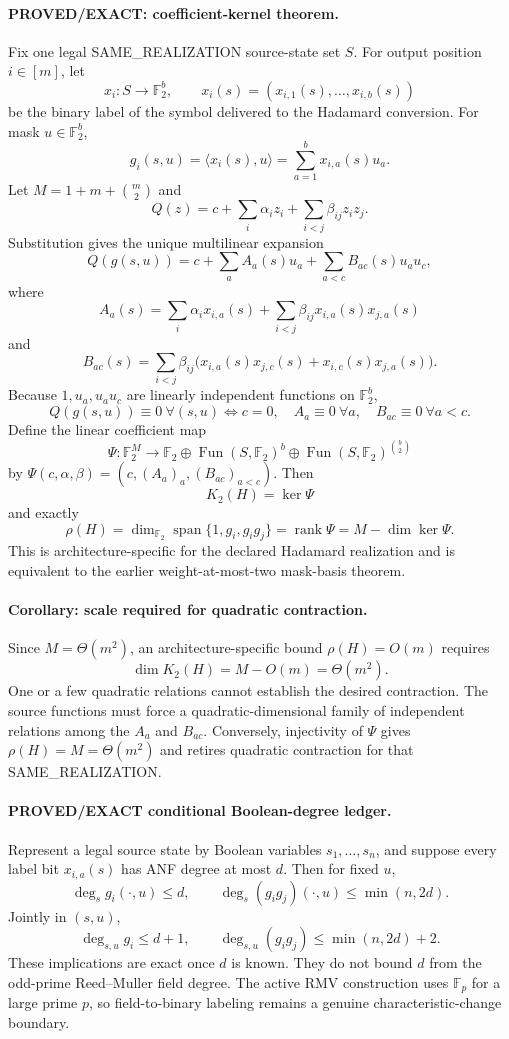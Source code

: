 \documentclass[11pt]{article}
\begin{document}
\paragraph{PROVED/EXACT: coefficient-kernel theorem.}
Fix one legal SAME\_REALIZATION source-state set $S$. For output position $i\in[m]$, let
\[
x_i:S\to\mathbb F_2^b,\qquad x_i(s)=(x_{i,1}(s),\ldots,x_{i,b}(s))
\]
be the binary label of the symbol delivered to the Hadamard conversion. For mask $u\in\mathbb F_2^b$,
\[
g_i(s,u)=\langle x_i(s),u\rangle=\sum_{a=1}^b x_{i,a}(s)u_a.
\]
Let $M=1+m+\binom m2$ and
\[
Q(z)=c+\sum_i\alpha_i z_i+\sum_{i<j}\beta_{ij}z_iz_j.
\]
Substitution gives the unique multilinear expansion
\[
Q(g(s,u))=c+\sum_a A_a(s)u_a+\sum_{a<c}B_{ac}(s)u_au_c,
\]
where
\[
A_a(s)=\sum_i\alpha_i x_{i,a}(s)+\sum_{i<j}\beta_{ij}x_{i,a}(s)x_{j,a}(s)
\]
and
\[
B_{ac}(s)=\sum_{i<j}\beta_{ij}
\bigl(x_{i,a}(s)x_{j,c}(s)+x_{i,c}(s)x_{j,a}(s)\bigr).
\]
Because $1,u_a,u_au_c$ are linearly independent functions on $\mathbb F_2^b$,
\[
Q(g(s,u))\equiv0\ \forall(s,u)
\iff c=0,\quad A_a\equiv0\ \forall a,\quad B_{ac}\equiv0\ \forall a<c.
\]
Define the linear coefficient map
\[
\Psi:\mathbb F_2^M\to
\mathbb F_2\oplus\operatorname{Fun}(S,\mathbb F_2)^b
\oplus\operatorname{Fun}(S,\mathbb F_2)^{\binom b2}
\]
by $\Psi(c,\alpha,\beta)=(c,(A_a)_a,(B_{ac})_{a<c})$. Then
\[
\boxed{K_2(H)=\ker\Psi}
\]
and exactly
\[
\boxed{\rho(H)=\dim_{\mathbb F_2}\operatorname{span}\{1,g_i,g_ig_j\}
=\operatorname{rank}\Psi=M-\dim\ker\Psi.}
\]
This is architecture-specific for the declared Hadamard realization and is equivalent to the earlier weight-at-most-two mask-basis theorem.

\paragraph{Corollary: scale required for quadratic contraction.}
Since $M=\Theta(m^2)$, an architecture-specific bound $\rho(H)=O(m)$ requires
\[
\boxed{\dim K_2(H)=M-O(m)=\Theta(m^2).}
\]
One or a few quadratic relations cannot establish the desired contraction. The source functions must force a quadratic-dimensional family of independent relations among the $A_a$ and $B_{ac}$. Conversely, injectivity of $\Psi$ gives $\rho(H)=M=\Theta(m^2)$ and retires quadratic contraction for that SAME\_REALIZATION.

\paragraph{PROVED/EXACT conditional Boolean-degree ledger.}
Represent a legal source state by Boolean variables $s_1,\ldots,s_n$, and suppose every label bit $x_{i,a}(s)$ has ANF degree at most $d$. Then for fixed $u$,
\[
\deg_s g_i(\cdot,u)\le d,\qquad
\deg_s(g_ig_j)(\cdot,u)\le\min(n,2d).
\]
Jointly in $(s,u)$,
\[
\deg_{s,u}g_i\le d+1,\qquad
\deg_{s,u}(g_ig_j)\le\min(n,2d)+2.
\]
These implications are exact once $d$ is known. They do not bound $d$ from the odd-prime Reed--Muller field degree. The active RMV construction uses $\mathbb F_p$ for a large prime $p$, so field-to-binary labeling remains a genuine characteristic-change boundary.
\end{document}
